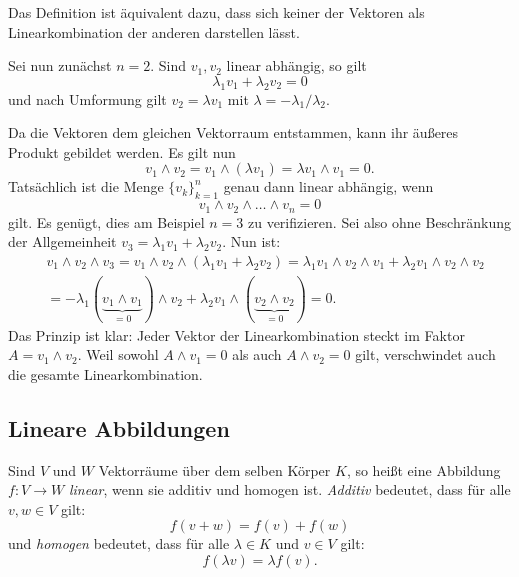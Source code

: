 \documentclass[a4paper,11pt,fleqn,twoside]{scrartcl}
\numberwithin{equation}{section}
\newcommand{\strong}[1]{{\sf\bfseries #1}}
\newenvironment{Definition}{\strong{Definition.}}{\par}
\begin{document}
Das Definition ist äquivalent dazu, dass sich keiner der Vektoren
als Linearkombination der anderen darstellen lässt.

Sei nun zunächst $n=2$. Sind $v_1,v_2$ linear abhängig, so gilt
\begin{equation}
\lambda_1 v_1+\lambda_2 v_2 = 0
\end{equation}
und nach Umformung gilt $v_2=\lambda v_1$ mit
$\lambda=-\lambda_1/\lambda_2$.

Da die Vektoren dem gleichen Vektorraum entstammen, kann ihr
äußeres Produkt gebildet werden. Es gilt nun
\begin{equation}
v_1\wedge v_2 = v_1\wedge (\lambda v_1) = \lambda v_1\wedge v_1 = 0.
\end{equation}
Tatsächlich ist die Menge $\{v_k\}_{k=1}^n$ genau dann linear
abhängig, wenn
\begin{equation}
v_1\wedge v_2\wedge\ldots\wedge v_n = 0
\end{equation}
gilt. Es genügt, dies am Beispiel $n=3$ zu verifizieren. Sei also
ohne Beschränkung der Allgemeinheit $v_3=\lambda_1 v_1+\lambda_2 v_2$.
Nun ist:
\begin{align}
&v_1\wedge v_2\wedge v_3
= v_1\wedge v_2\wedge(\lambda_1 v_1+\lambda_2 v_2)
= \lambda_1 v_1\wedge v_2\wedge v_1
+ \lambda_2 v_1\wedge v_2\wedge v_2\\
&= -\lambda_1 (\underbrace{v_1\wedge v_1}_{=0})\wedge v_2
+ \lambda_2 v_1\wedge (\underbrace{v_2\wedge v_2}_{=0})
= 0.
\end{align}
Das Prinzip ist klar: Jeder Vektor der Linearkombination steckt
im Faktor $A=v_1\wedge v_2$. Weil sowohl $A\wedge v_1=0$ als auch
$A\wedge v_2=0$ gilt, verschwindet auch die gesamte Linearkombination.

\subsection{Lineare Abbildungen}

\begin{Definition}
Sind $V$ und $W$ Vektorräume über dem selben Körper $K$, so heißt
eine Abbildung $f\colon V\to W$ \emph{linear}, wenn sie additiv
und homogen ist. \emph{Additiv} bedeutet, dass für alle $v,w\in V$
gilt:
\begin{equation}
f(v+w) = f(v)+f(w)
\end{equation}
und \emph{homogen} bedeutet, dass für alle $\lambda\in K$ und $v\in V$
gilt:
\begin{equation}
f(\lambda v) = \lambda f(v).
\end{equation}
\end{Definition}
\end{document}
